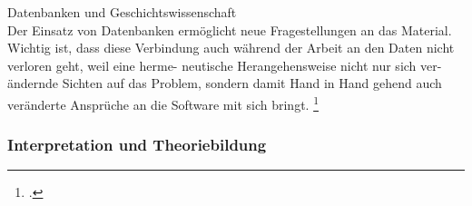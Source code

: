 \documentclass[12pt,a4paper]{article}
\begin{document}
Datenbanken und Geschichtswissenschaft
\\
Der Einsatz von Datenbanken ermöglicht neue Fragestellungen an das Material. Wichtig ist, dass 
diese Verbindung auch während der Arbeit an 
den Daten nicht verloren geht, weil eine herme-
neutische Herangehensweise nicht nur sich ver-
ändernde Sichten auf das Problem, sondern 
damit Hand in Hand gehend auch veränderte 
Ansprüche an die Software mit sich bringt. \footcite[][S.239-242]{vasold2015allerunderthenigsten}


\subsubsection{Interpretation und Theoriebildung}
\end{document}

